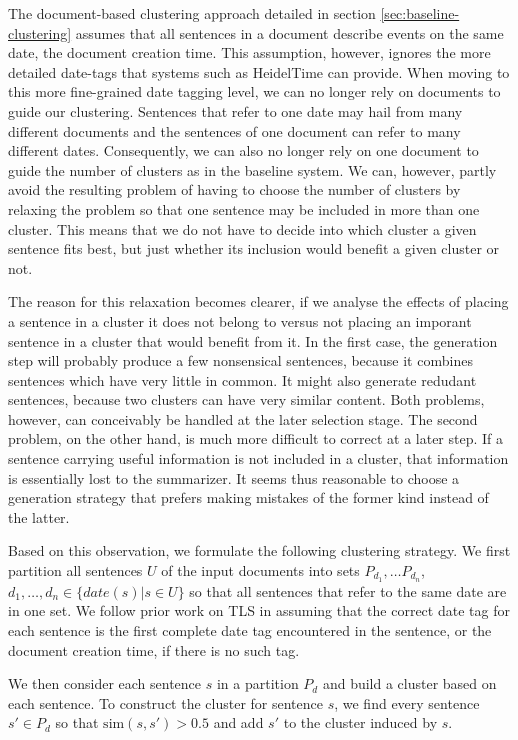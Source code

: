 \documentclass[a4paper,BCOR=10mm]{report}
\begin{document}
The document-based clustering approach detailed in section \ref{sec:baseline-clustering} assumes that all sentences in a document describe events on the same date, the document creation time. This assumption, however, ignores the more detailed date-tags that systems such as HeidelTime \citep{heideltime} can provide.
When moving to this more fine-grained date tagging level, we can no longer rely on documents to guide our clustering. Sentences that refer to one date may hail from many different documents and the sentences of one document can refer to many different dates.
Consequently, we can also no longer rely on one document to guide the number of clusters as in the baseline system. We can, however, partly avoid the resulting problem of having to choose the number of clusters by relaxing the problem so that one sentence may be included in more than one cluster.
This means that we do not have to decide into which cluster a given sentence fits best, but just whether its inclusion would benefit a given cluster or not.

The reason for this relaxation becomes clearer, if we analyse the effects of placing a sentence in a cluster it does not belong to versus not placing an imporant sentence in a cluster that would benefit from it.
In the first case, the generation step will probably produce a few nonsensical sentences, because it combines sentences which have very little in common.
It might also generate redudant sentences, because two clusters can have very similar content. Both problems, however, can conceivably be handled at the later selection stage.
The second problem, on the other hand, is much more difficult to correct at a later step. If a sentence carrying useful information is not included in a cluster, that information is essentially lost to the summarizer. It seems thus reasonable to choose a generation strategy that prefers making mistakes of the former kind instead of the latter.

Based on this observation, we formulate the following clustering strategy. We first partition all sentences $U$ of the input documents into sets $P_{d_1}, \dots P_{d_n}$, $d_1, \dots, d_n \in \{ date(s) | s \in U \}$ so that all sentences that refer to the same date are in one set. We follow prior work on TLS in assuming that the correct date tag for each sentence is the first complete date tag encountered in the sentence, or the document creation time, if there is no such tag.

We then consider each sentence $s$ in a partition $P_d$ and build a cluster based on each sentence.
To construct the cluster for sentence $s$, we find every sentence $s' \in P_d$ so that $\text{sim}(s, s') > 0.5$ and add $s'$ to the cluster induced by $s$.
\end{document}
